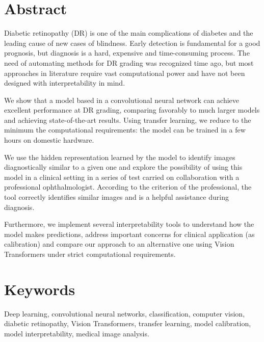 
\newpage

\thispagestyle{empty}

\section*{Abstract}
Diabetic retinopathy (DR) is one of the main complications of diabetes and the leading cause of new cases of blindness. Early detection is fundamental for a good prognosis, but diagnosis is a hard, expensive and time-consuming process. The need of automating methods for DR grading was recognized time ago, but most approaches in literature require vast computational power and have not been designed with interpretability in mind.

We show that a model based in a convolutional neural network can achieve excellent performance at DR grading, comparing favorably to much larger models and achieving state-of-the-art results. Using transfer learning, we reduce to the minimum the computational requirements: the model can be trained in a few hours on domestic hardware.

We use the hidden representation learned by the model to identify images diagnostically similar to a given one and explore the possibility of using this model in a clinical setting in a series of test carried on collaboration with a professional ophthalmologist. According to the criterion of the professional, the tool correctly identifies similar images and is a helpful assistance during diagnosis.

Furthermore, we implement several interpretability tools to understand how the model makes predictions, address important concerns for clinical application (as calibration) and compare our approach to an alternative one using Vision Transformers under strict computational requirements.

\section*{Keywords}
Deep learning, convolutional neural networks, classification, computer vision, diabetic retinopathy, Vision Transformers, transfer learning, model calibration, model interpretability, medical image analysis.


